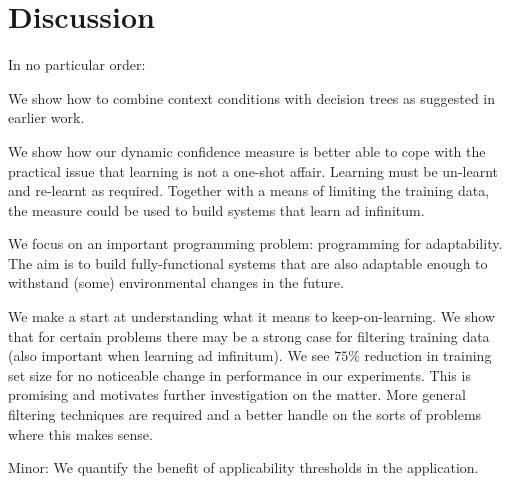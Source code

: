 \section{Discussion}\label{sec:discussion}

In no particular order:

We show how to combine context conditions with decision trees as suggested in earlier work.

We show how our dynamic confidence measure is better able to cope with the practical issue that learning is not a one-shot affair. Learning must be un-learnt and re-learnt as required. Together with a means of limiting the training data, the measure could be used to build systems that learn ad infinitum.

We focus on an important programming problem: programming for adaptability. The aim is to build fully-functional systems that are also adaptable enough to withstand (some) environmental changes in the future. 

We make a start at understanding what it means to keep-on-learning. We show that for certain problems there may be a strong case for filtering training data (also important when learning ad infinitum). We see $75\%$ reduction in training set size for no noticeable change in performance in our experiments. This is promising and motivates further investigation on the matter. More general filtering techniques are required and a better handle on the sorts of problems where this makes sense.


Minor: We quantify the benefit of applicability thresholds in the application.



